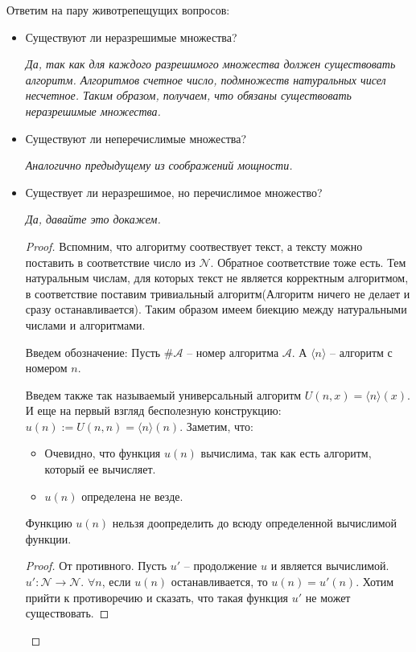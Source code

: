 Ответим на пару животрепещущих вопросов:
\begin{itemize}
    \item Существуют ли неразрешимые множества? 
    
    \textit{Да, так как для каждого разрешимого множества должен существовать алгоритм. Алгоритмов счетное число, подмножеств натуральных чисел несчетное. Таким образом, получаем, что обязаны существовать неразрешимые множества.}
    \item Существуют ли неперечислимые множества? 
    
    \textit{Аналогично предыдущему из соображений мощности.}
    \item Существует ли неразрешимое, но перечислимое множество? 
    
    \textit{Да, давайте это докажем.}
    \begin{proof}
        Вспомним, что алгоритму соотвествует текст, а тексту можно поставить в соответствие число из $\mathcal{N}$. Обратное соответствие тоже есть. Тем натуральным числам, для которых текст не является корректным алгоритмом, в соответствие поставим тривиальный алгоритм(Алгоритм ничего не делает и сразу останавливается). Таким образом имеем биекцию между натуральными числами и алгоритмами. 
        
        Введем обозначение: 
        Пусть $\# \mathcal{A}$ -- номер алгоритма $\mathcal{A}$. А $\langle n \rangle$ -- алгоритм с номером $n$. 
        
        Введем также так называемый универсальный алгоритм $U(n, x) = \langle n \rangle (x)$. И еще на первый взгляд бесполезную конструкцию: $u(n) := U(n, n) = \langle n \rangle (n)$. Заметим, что:
        \begin{itemize}
            \item Очевидно, что функция $u(n)$ вычислима, так как есть алгоритм, который ее вычисляет.
            \item $u(n)$ определена не везде.
        \end{itemize} 
        \begin{lemma}
            Функцию $u(n)$ нельзя доопределить до всюду определенной вычислимой функции. 
        \end{lemma}
        \begin{proof}
            От противного. Пусть $u'$ -- продолжение $u$ и является вычислимой. $u' : \mathcal{N} \longrightarrow \mathcal{N}$. $\forall n$, если $u(n)$ останавливается, то $u(n) = u'(n)$. Хотим прийти к противоречию и сказать, что такая функция $u'$ не может существовать. 


\end{proof}
\end{proof}
\end{itemize}
